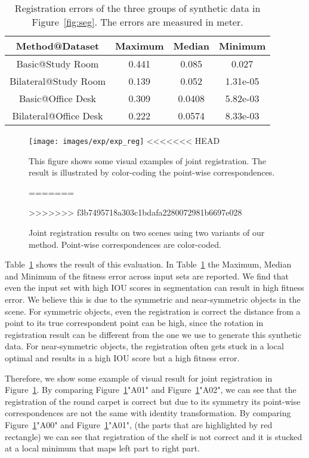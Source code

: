 \begin{table}
	\centering
	\caption{Registration errors of the three groups of synthetic data in Figure~\ref{fig:seg}. The errors are measured in meter.}
	\begin{tabular}{c | c c c}
		Method@Dataset&Maximum&Median&Minimum\\
		\hline 
		Basic@Study Room&0.441&0.085&0.027\\
		Bilateral@Study Room&0.139&0.052&1.31e-05\\
	    Basic@Office Desk&0.309&0.0408&5.82e-03\\
		Bilateral@Office Desk&0.222&0.0574&8.33e-03\\
	\end{tabular}
	\label{tab:regerror}
\end{table}
\begin{figure}[htb]
	\centering
	\texttt{[image: images/exp/exp\_reg]}
<<<<<<< HEAD
	\caption{This figure shows some visual examples of joint registration.  The result  is illustrated by color-coding the point-wise correspondences. }
=======
	\caption{Joint registration results on two scenes using two variants of our method. Point-wise correspondences are color-coded.}
>>>>>>> f3b7495718a303c1bdafa2280072981b6697e028
	\label{fig:reg_colorcode}
\end{figure}
Table~\ref{tab:regerror} shows the result of this evaluation. In Table~\ref{tab:regerror} the Maximum, Median and Minimum of the fitness error across input sets are reported.
%
We find that even the input set with high IOU scores in segmentation can result in high fitness error. We believe this is due to the symmetric and near-symmetric objects in the scene. For symmetric objects, even the registration is correct the distance from a point to its true correspondent point can be high, since the rotation in registration result can be different from the one we use to generate this synthetic data. For near-symmetric objects, the registration often gets stuck in a local optimal and results in a high IOU score but a high fitness error. 

Therefore, we show some example of visual result for joint registration in Figure~\ref{fig:reg_colorcode}. By comparing Figure~\ref{fig:reg_colorcode}"A01" and Figure~\ref{fig:reg_colorcode}"A02", we can see that the registration of the round carpet is correct but due to its symmetry its point-wise correspondences are not the same with identity transformation.
By comparing Figure~\ref{fig:reg_colorcode}"A00" and Figure~\ref{fig:reg_colorcode}"A01", (the parts that are highlighted by red rectangle) we can see that registration of the shelf is not correct and it is stucked at a local minimum that maps left part to right part.

